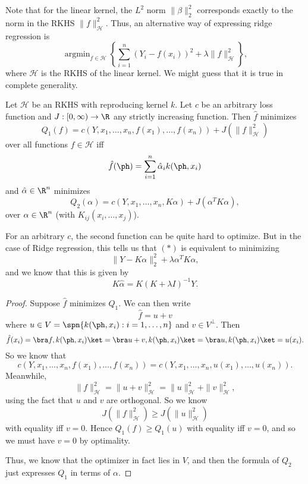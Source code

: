 \documentclass[a4paper]{article}
\DeclareMathOperator*\argmin{argmin}
\begin{document}
Note that for the linear kernel, the $L^2$ norm $\|\beta\|_2^2$ corresponds exactly to the norm in the RKHS $\|f\|_{\mathcal{H}}^2$. Thus, an alternative way of expressing ridge regression is
\[
  \argmin_{f \in \mathcal{H}} \left\{\sum_{i = 1}^n (Y_i - f(x_i))^2 + \lambda \|f\|_{\mathcal{H}}^2 \right\},\tag{$*$}
\]
where $\mathcal{H}$ is the RKHS of the linear kernel. We might guess that it is true in complete generality.

\begin{thm}
  Let $\mathcal{H}$ be an RKHS with reproducing kernel $k$. Let $c$ be an arbitrary loss function and $J: [0, \infty) \to \R$ any strictly increasing function. Then $\hat{f}$ minimizes
  \[
    Q_1(f) = c(Y, x_1, \ldots, x_n, f(x_1), \ldots, f(x_n)) + J(\|f\|_{\mathcal{H}}^2)
  \]
  over all functions $f \in \mathcal{H}$ iff
  \[
    \hat{f}(\ph) = \sum_{i = 1}^n \hat{\alpha}_i k(\ph, x_i)
  \]
  and $\hat{\alpha} \in \R^n$ minimizes
  \[
    Q_2(\alpha) = c(Y, x_1, \ldots, x_n, K\alpha) + J(\alpha^T K \alpha),
  \]
  over $\alpha \in \R^n$ (with $K_{ij}(x_i, \ldots, x_j)$).
\end{thm}
For an arbitrary $c$, the second function can be quite hard to optimize. But in the case of Ridge regression, this tells us that $(*)$ is equivalent to minimizing
\[
  \|Y - K\alpha\|_2^2 + \lambda \alpha^T K \alpha,
\]
and we know that this is given by
\[
  K \hat{\alpha} = K(K + \lambda I)^{-1} Y.
\]
\begin{proof}
  Suppose $\hat{f}$ minimizes $Q_1$. We can then write
  \[
    \hat{f} = u + v
  \]
  where $u \in V = \spn\{k(\ph, x_i): i = 1, \ldots ,n\}$ and $v \in V^\perp$. Then
  \[
    \hat{f}(x_i) = \bra f, k(\ph, x_i)\ket = \bra u + v, k(\ph, x_i)\ket = \bra u, k(\ph, x_i)\ket = u(x_i).
  \]
  So we know that
  \[
    c(Y, x_1, \ldots, x_n, f(x_1), \ldots, f(x_n)) = c(Y, x_1, \ldots, x_n, u(x_1), \ldots, u(x_n)).
  \]
  Meanwhile,
  \[
    \|f\|^2_{\mathcal{H}} = \|u + v\|^2_{\mathcal{H}} = \|u\|^2_{\mathcal{H}} + \|v\|^2_{\mathcal{H}},
  \]
  using the fact that $u$ and $v$ are orthogonal. So we know
  \[
    J(\|f\|_{\mathcal{H}}^2 ) \geq J(\|u\|_{\mathcal{H}}^2)
  \]
  with equality iff $v = 0$. Hence $Q_1(f) \geq Q_1(u)$ with equality iff $v = 0$, and so we must have $v = 0$ by optimality.

  Thus, we know that the optimizer in fact lies in $V$, and then the formula of $Q_2$ just expresses $Q_1$ in terms of $\alpha$.
\end{proof}
\end{document}
